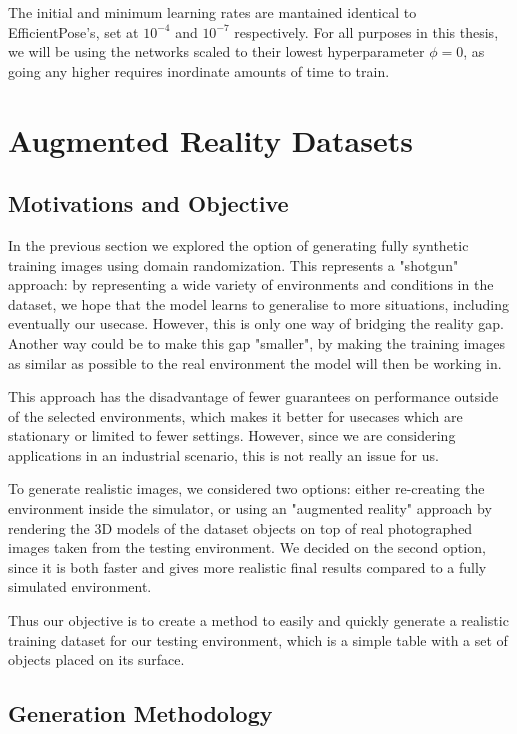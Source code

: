 The initial and minimum learning rates are mantained identical to EfficientPose's, set at $10^{-4}$ and $10^{-7}$ respectively. For all purposes in this thesis, we will be using the networks scaled to their lowest hyperparameter $\phi = 0$, as going any higher requires inordinate amounts of time to train.

\section{Augmented Reality Datasets}

\subsection{Motivations and Objective}

In the previous section we explored the option of generating fully synthetic training images using domain randomization. This represents a "shotgun" approach: by representing a wide variety of environments and conditions in the dataset, we hope that the model learns to generalise to more situations, including eventually our usecase. However, this is only one way of bridging the reality gap. Another way could be to make this gap "smaller", by making the training images as similar as possible to the real environment the model will then be working in.

This approach has the disadvantage of fewer guarantees on performance outside of the selected environments, which makes it better for usecases which are stationary or limited to fewer settings. However, since we are considering applications in an industrial scenario, this is not really an issue for us.

To generate realistic images, we considered two options: either re-creating the environment inside the simulator, or using an "augmented reality" approach by rendering the 3D models of the dataset objects on top of real photographed images taken from the testing environment. We decided on the second option, since it is both faster and gives more realistic final results compared to a fully simulated environment.

Thus our objective is to create a method to easily and quickly generate a realistic training dataset for our testing environment, which is a simple table with a set of objects placed on its surface.

\subsection{Generation Methodology}

